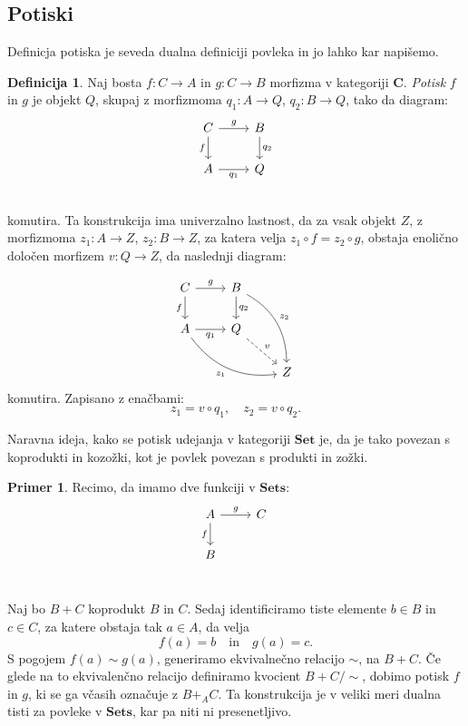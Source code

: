 \documentclass[12pt,a4paper]{book}
\theoremstyle{definition}
\newtheorem{definicija}{Definicija}[chapter]
\theoremstyle{plain}
\theoremstyle{definition}
\newtheorem{primer}{Primer}[section]
\theoremstyle{remark}
\newcommand{\cat}[1]{\textbf{#1}}
\begin{document}
\subsection{Potiski}

Definicja potiska je seveda dualna definiciji povleka in jo lahko kar napišemo.

\begin{definicija}
Naj bosta $f: C \to A$ in $g : C \to B$ morfizma v kategoriji $\cat{C}$. \emph{Potisk} $f$ in $g$ je objekt $Q$, skupaj z morfizmoma $q_1 : A \to Q$, $q_2 : B \to Q$, tako da diagram:
$$\begin{tikzcd}
C \ar[r, "g"] \ar[d, "f"'] & B \ar[d, "q_2"] \\
A \ar[r, "q_1"'] & Q \\
\end{tikzcd}$$
komutira. Ta konstrukcija ima univerzalno lastnost, da za vsak objekt $Z$, z morfizmoma $z_1 : A \to Z$, $z_2 : B \to Z$, za katera velja $z_1 \circ f = z_2 \circ g$, obstaja enolično določen morfizem $v : Q \to Z$, da naslednji diagram:

$$\begin{tikzcd}
C \ar[r, "g"] \ar[d, "f"'] & B \ar[d, "q_2"] \ar[ddr, bend left, "z_2"] & \\
A \ar[r, "q_1"'] \ar[drr, bend right, "z_1"'] & Q \ar[dr, dashed, "v"] & \\
& & Z 
\end{tikzcd}$$
komutira. Zapisano z enačbami:
$$z_1 = v \circ  q_1, \quad z_2 = v \circ q_2.$$
\end{definicija}

Naravna ideja, kako se potisk udejanja v kategoriji $\cat{Set}$ je, da je tako povezan s koprodukti in kozožki, kot je povlek povezan s produkti in zožki.

\begin{primer}
Recimo, da imamo dve funkciji v $\cat{Sets}$:
$$ \begin{tikzcd}
A \ar[d, "f"'] \ar[r, "g"] & C \\
B & \\
\end{tikzcd} $$

Naj bo $B + C$ koprodukt $B$ in $C$. Sedaj identificiramo tiste elemente $b \in B$ in $c \in C$, za katere obstaja tak $a \in A$, da velja
$$f(a) = b \quad \text{in} \quad g(a) = c.$$
S pogojem $f(a) \sim g(a)$, generiramo ekvivalnečno relacijo $\sim$, na $B + C$. Če glede na to ekvivalenčno relacijo definiramo kvocient $B + C/\sim$, dobimo potisk $f$ in $g$, ki se ga včasih označuje z $B +_A C$. Ta konstrukcija je v veliki meri dualna tisti za povleke v $\cat{Sets}$, kar pa niti ni presenetljivo.

\end{primer}
\end{document}
